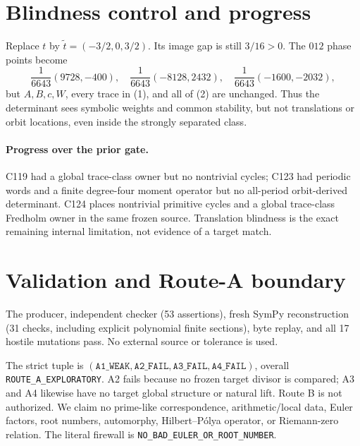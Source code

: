 \documentclass[10pt]{article}
\begin{document}
\section{Blindness control and progress}
Replace $t$ by $\widetilde t=(-3/2,0,3/2)$.  Its image gap is still
$3/16>0$.  The $012$ phase points become
\[
\frac1{6643}(9728,-400),\quad
\frac1{6643}(-8128,2432),\quad
\frac1{6643}(-1600,-2032),
\]
but $A,B,c,W$, every trace in (1), and all of (2) are unchanged.  Thus the
determinant sees symbolic weights and common stability, but not translations
or orbit locations, even inside the strongly separated class.

\paragraph{Progress over the prior gate.}
C119 had a global trace-class owner but no nontrivial cycles; C123 had periodic
words and a finite degree-four moment operator but no all-period orbit-derived
determinant.  C124 places nontrivial primitive cycles and a global trace-class
Fredholm owner in the same frozen source.  Translation blindness is the exact
remaining internal limitation, not evidence of a target match.

\section{Validation and Route-A boundary}
The producer, independent checker (53 assertions), fresh SymPy reconstruction
(31 checks, including explicit polynomial finite sections), byte replay, and
all 17 hostile mutations pass.  No external source or tolerance is used.

The strict tuple is
$(\texttt{A1\_WEAK},\texttt{A2\_FAIL},\texttt{A3\_FAIL},
\texttt{A4\_FAIL})$, overall \texttt{ROUTE\_A\_EXPLORATORY}.
A2 fails because no frozen target divisor is compared; A3 and A4 likewise have
no target global structure or natural lift.  Route B is not authorized.  We
claim no prime-like correspondence, arithmetic/local data, Euler factors, root
numbers, automorphy, Hilbert--P\'olya operator, or Riemann-zero relation.  The
literal firewall is \texttt{NO\_BAD\_EULER\_OR\_ROOT\_NUMBER}.
\end{document}
